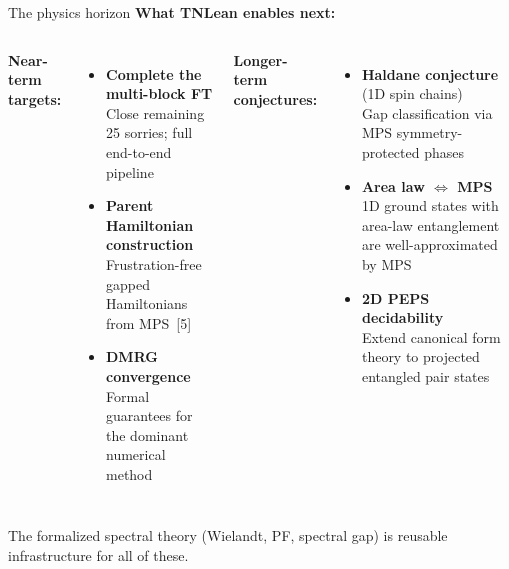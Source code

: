 \documentclass[aspectratio=169,10pt]{beamer}
\begin{document}
\begin{frame}{The physics horizon}
    \vspace{-0.3em}
    \textcolor{leangreen}{\textbf{What TNLean enables next:}}
    \vspace{0.3em}
    \begin{columns}[T]
        \textbf{Near-term targets:}
        \begin{itemize}
            \item \textbf{Complete the multi-block FT}\\{\scriptsize Close remaining 25 sorries; full end-to-end pipeline}
            \item \textbf{Parent Hamiltonian construction}\\{\scriptsize Frustration-free gapped Hamiltonians from MPS~[5]}
            \item \textbf{DMRG convergence}\\{\scriptsize Formal guarantees for the dominant numerical method}
        \end{itemize}
        \textbf{Longer-term conjectures:}
        \begin{itemize}
            \item \textbf{Haldane conjecture} (1D spin chains)\\{\scriptsize Gap classification via MPS symmetry-protected phases}
            \item \textbf{Area law $\Leftrightarrow$ MPS}\\{\scriptsize 1D ground states with area-law entanglement are well-approximated by MPS}
            \item \textbf{2D PEPS decidability}\\{\scriptsize Extend canonical form theory to projected entangled pair states}
        \end{itemize}
    \end{columns}
    \vspace{0.4em}
    \textcolor{dimwhite}{\footnotesize The formalized spectral theory (Wielandt, PF, spectral gap) is reusable infrastructure for all of these.}
\end{frame}
\end{document}
